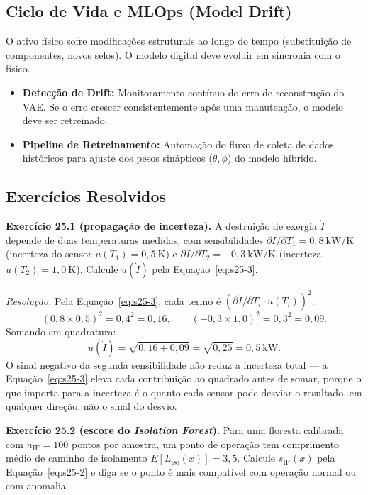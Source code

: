 \documentclass[12pt,a4paper]{article}
\numberwithin{equation}{section}
\numberwithin{table}{section}
\numberwithin{figure}{section}
\begin{document}
	\subsection{Ciclo de Vida e MLOps (Model Drift)}
	O ativo físico sofre modificações estruturais ao longo do tempo (substituição de componentes, novos selos). O modelo digital deve evoluir em sincronia com o físico.
	\begin{itemize}
		\item \textbf{Detecção de Drift:} Monitoramento contínuo do erro de reconstrução do VAE. Se o erro crescer consistentemente após uma manutenção, o modelo deve ser retreinado.
		\item \textbf{Pipeline de Retreinamento:} Automação do fluxo de coleta de dados históricos para ajuste dos pesos sinápticos ($\theta, \phi$) do modelo híbrido.
	\end{itemize}

	\subsection{Exercícios Resolvidos}

	\textbf{Exercício 25.1 (propagação de incerteza).} A destruição de
	exergia $\dot{I}$ depende de duas temperaturas medidas, com
	sensibilidades $\partial \dot{I}/\partial T_1 = 0{,}8\ \mathrm{kW/K}$
	(incerteza do sensor $u(T_1)=0{,}5\ \mathrm{K}$) e
	$\partial \dot{I}/\partial T_2 = -0{,}3\ \mathrm{kW/K}$ (incerteza
	$u(T_2)=1{,}0\ \mathrm{K}$). Calcule $u(\dot{I})$ pela
	Equação~\eqref{eq:s25-3}.

	\emph{Resolução.} Pela Equação~\eqref{eq:s25-3}, cada termo é
	$(\partial \dot{I}/\partial T_i \cdotp u(T_i))^2$:
	$$(0{,}8 \times 0{,}5)^2 = 0{,}4^2 = 0{,}16, \qquad
	(-0{,}3 \times 1{,}0)^2 = 0{,}3^2 = 0{,}09.$$
	Somando em quadratura:
	$$u(\dot{I}) = \sqrt{0{,}16+0{,}09} = \sqrt{0{,}25} = 0{,}5\
	\mathrm{kW}.$$
	O sinal negativo da segunda sensibilidade não reduz a incerteza total
	--- a Equação~\eqref{eq:s25-3} eleva cada contribuição ao quadrado
	antes de somar, porque o que importa para a incerteza é o quanto cada
	sensor pode desviar o resultado, em qualquer direção, não o sinal do
	desvio.

	\textbf{Exercício 25.2 (escore do \textit{Isolation Forest}).} Para
	uma floresta calibrada com $n_{\text{IF}}=100$ pontos por amostra, um
	ponto de operação tem comprimento médio de caminho de isolamento
	$E[L_{\text{iso}}(x)] = 3{,}5$. Calcule $s_{\text{IF}}(x)$ pela
	Equação~\eqref{eq:s25-2} e diga se o ponto é mais compatível com
	operação normal ou com anomalia.
\end{document}

